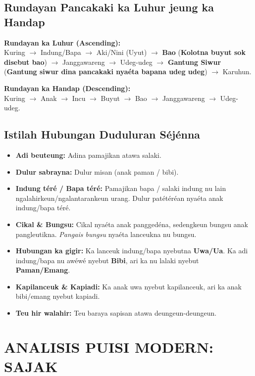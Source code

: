 \documentclass[12pt, a4paper]{article}
\begin{document}
\subsection{Rundayan Pancakaki ka Luhur jeung ka Handap}
\textbf{Rundayan ka Luhur (Ascending):} \\
Kuring $\rightarrow$ Indung/Bapa $\rightarrow$ Aki/Nini (Uyut) $\rightarrow$ \textbf{Bao} (\textbf{Kolotna buyut sok disebut bao}) $\rightarrow$ Janggawareng $\rightarrow$ Udeg-udeg $\rightarrow$ \textbf{Gantung Siwur} (\textbf{Gantung siwur dina pancakaki nyaéta bapana udeg udeg}) $\rightarrow$ Karuhun.

\textbf{Rundayan ka Handap (Descending):} \\
Kuring $\rightarrow$ Anak $\rightarrow$ Incu $\rightarrow$ Buyut $\rightarrow$ Bao $\rightarrow$ Janggawareng $\rightarrow$ Udeg-udeg.

\subsection{Istilah Hubungan Duduluran Séjénna}
\begin{itemize}
    \item \textbf{Adi beuteung:} Adina pamajikan atawa salaki.
    \item \textbf{Dulur sabrayna:} Dulur misan (anak paman / bibi).
    \item \textbf{Indung téré / Bapa téré:} Pamajikan bapa / salaki indung nu lain ngalahirkeun/ngalantarankeun urang. Dulur patétéréan nyaéta anak indung/bapa téré.
    \item \textbf{Cikal \& Bungsu:} Cikal nyaéta anak panggedéna, sedengkeun bungsu anak pangleutikna. \textit{Pangais bungsu} nyaéta lanceukna nu bungsu.
    \item \textbf{Hubungan ka gigir:} Ka lanceuk indung/bapa nyebutna \textbf{Uwa/Ua}. Ka adi indung/bapa nu awéwé nyebut \textbf{Bibi}, ari ka nu lalaki nyebut \textbf{Paman/Emang}.
    \item \textbf{Kapilanceuk \& Kapiadi:} Ka anak uwa nyebut kapilanceuk, ari ka anak bibi/emang nyebut kapiadi.
    \item \textbf{Teu hir walahir:} Teu baraya sapisan atawa deungeun-deungeun.
\end{itemize}

\newpage

\section{ANALISIS PUISI MODERN: SAJAK}
\end{document}
